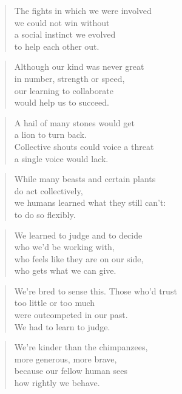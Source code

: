 \documentclass[14pt,a4paper]{article}
\begin{document}
\begin{verse}
The fights in which we were involved\\
we could not win without\\
a social instinct we evolved\\
to help each other out.
\end{verse}

\begin{verse}
Although our kind was never great\\
in number, strength or speed,\\
our learning to collaborate\\
would help us to succeed.
\end{verse}

\begin{verse}
A hail of many stones would get\\
a lion to turn back.\\
Collective shouts could voice a threat\\
a single voice would lack.
\end{verse}

\begin{verse}
While many beasts and certain plants\\
do act collectively,\\
we humans learned what they still can’t:\\
to do so flexibly.
\end{verse}

\begin{verse}
We learned to judge and to decide\\
who we’d be working with,\\
who feels like they are on our side,\\
who gets what we can give.
\end{verse}

\begin{verse}
We’re bred to sense this. Those who’d trust\\
too little or too much\\
were outcompeted in our past.\\
We had to learn to judge.
\end{verse}

\begin{verse}
We’re kinder than the chimpanzees,\\
more generous, more brave,\\
because our fellow human sees\\
how rightly we behave.
\end{verse}
\end{document}
